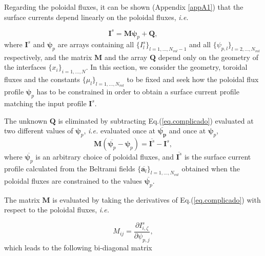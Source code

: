 \documentclass[my_thesis.tex]{subfiles}
\begin{document}
Regarding the poloidal fluxes, it can be shown  (Appendix \ref{appA1}) that the surface currents depend linearly on the poloidal fluxes, \textit{i.e.} 

\begin{equation}
	\mathbf{I}^s=\mathbf{M}\bm{\psi}_p+\mathbf{Q}\label{eq.complicado},    
\end{equation}
where $\mathbf{I}^s$ and $\bm{\psi}_p$ are arrays containing all $\{I^s_l\}_{l=1,\ldots,N_{vol}-1}$ and all $\{\psi_{p,l}\}_{l=2,\ldots,N_{vol}}$ respectively, and the matrix $\mathbf{M}$ and the  array $\mathbf{Q}$ depend only on the geometry of the interfaces $\{x_i\}_{i=1,\ldots,N}$. In this section, we consider the geometry, toroidal fluxes and the constants $\{\mu_l\}_{l=1,\ldots,N_{vol}}$ to be fixed and seek how the poloidal flux profile $\bm{\psi}_p$ has to be constrained in order to obtain a surface current profile matching the input profile $\mathbf{I}^s$.

The unknown $\mathbf{Q}$ is eliminated by subtracting Eq.(\ref{eq.complicado}) evaluated at two different values of $\bm{\psi}_p$, \textit{i.e.} evaluated once at $\overbar{\bm{\psi_p}}$ and once at $\bm{\psi}_p$,
\begin{equation}
	\mathbf{M} (\overbar{\bm{\psi}_p} - \bm{\psi}_p) = \overbar{\bm{I}^{s}} - \bm{I}^{s}, \label{eq.psip_diff}
\end{equation}
where $\overbar{\bm{\psi}_p}$ is an arbitrary choice of poloidal fluxes, and $\overbar{\bm{I}^s}$ is the surface current profile calculated from the Beltrami fields $\{\overbar{\mathbf{a}_l}\}_{l=1,\ldots,N_{vol}}$ obtained when the poloidal fluxes are constrained to the values $\overbar{\bm{\psi}_p}$.

The matrix $\mathbf{M}$ is evaluated by taking the derivatives of Eq.(\ref{eq.complicado}) with respect to the poloidal fluxes, \textit{i.e.}

\begin{equation}
	M_{ij} = \frac{\partial I^s_{i,\zeta}}{\partial \psi_{p,j}},\label{eq.coef_M}
\end{equation}
which leads to the following bi-diagonal matrix
\end{document}
